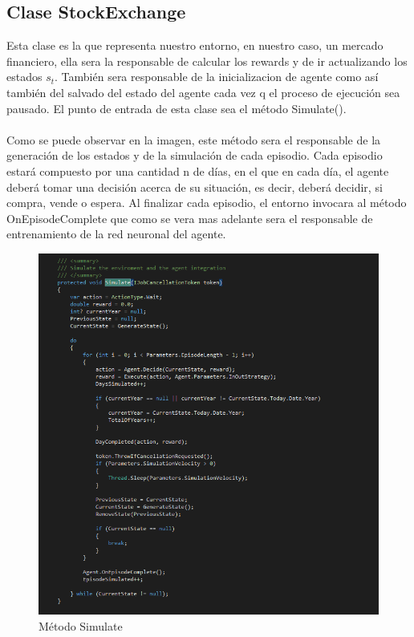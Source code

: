 \subsection{Clase StockExchange}

Esta clase es la que representa nuestro entorno, en nuestro caso, un mercado financiero, ella sera la responsable de calcular los rewards y de ir actualizando los estados $s_t$. También sera responsable de la inicializacion de agente como así también del salvado del estado del agente cada vez q el proceso de ejecución sea pausado. El punto de entrada de esta clase sea el método Simulate().
\\\\
Como se puede observar en la imagen, este método sera el responsable de la generación de los estados y de la simulación de cada episodio. Cada episodio estará compuesto por una cantidad n de días, en el que en cada día, el agente
deberá tomar una decisión acerca de su situación, es decir, deberá decidir, si compra, vende o espera. Al finalizar cada episodio, el entorno invocara al método OnEpisodeComplete que como se vera mas adelante sera el responsable de entrenamiento de la red neuronal del agente.\\

\begin{figure}[h!]
	\centering
	\includegraphics[scale=0.7]{imagenes/screen5.png}
	\caption{Método Simulate}
\end{figure}

